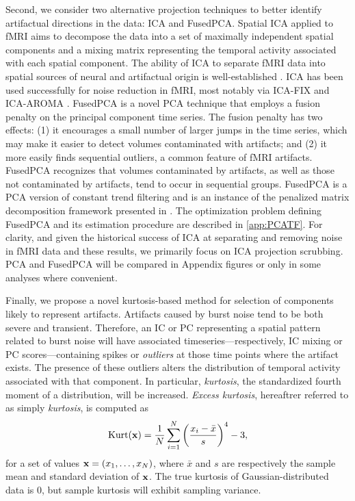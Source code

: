 \documentclass{article}
\begin{document}
Second, we consider two alternative projection techniques to better identify artifactual directions in the data: ICA and FusedPCA.  Spatial ICA applied to fMRI aims to decompose the data into a set of maximally independent spatial components and a mixing matrix representing the temporal activity associated with each spatial component. The ability of ICA to separate fMRI data into spatial sources of neural and artifactual origin is well-established \citep{mckeown1998analysis}. ICA has been used successfully for noise reduction in fMRI, most notably via ICA-FIX \citep{griffantiICAbasedArtefactRemoval2014} and ICA-AROMA \citep{pruimICAAROMARobustICAbased2015}. %
FusedPCA is a novel PCA technique that employs a fusion penalty on the principal component time series. The fusion penalty has two effects: (1) it encourages a small number of larger jumps in the time series, which may make it easier to detect volumes contaminated with artifacts; and (2) it more easily finds sequential outliers, a common feature of fMRI artifacts. FusedPCA recognizes that volumes contaminated by artifacts, as well as those not contaminated by artifacts, tend to occur in sequential groups. FusedPCA is a PCA version of constant trend filtering \citep{tibshiraniAdaptivePiecewisePolynomial2014, kimEllTrendFiltering2009} and is an instance of the penalized matrix decomposition framework presented in \cite{wittenPenalizedMatrixDecomposition2009}. The optimization problem defining FusedPCA and its estimation procedure are described in \autoref{app:PCATF}. For clarity, and given the historical success of ICA at separating and removing noise in fMRI data and these results, we primarily focus on ICA projection scrubbing. PCA and FusedPCA will be compared in Appendix figures or only in some analyses where convenient. 

Finally, we propose a novel kurtosis-based method for selection of components likely to represent artifacts. Artifacts caused by burst noise tend to be both severe and transient. Therefore, an IC or PC representing a spatial pattern related to burst noise will have associated timeseries---respectively, IC mixing or PC scores---containing spikes or \textit{outliers} at those time points where the artifact exists. The presence of these outliers alters the distribution of temporal activity associated with that component. In particular, \textit{kurtosis}, the standardized fourth moment of a distribution, will be increased. \textit{Excess kurtosis}, hereaftrer referred to as simply \textit{kurtosis}, is computed as 
$$
\text{Kurt}(\mathbf x) = \frac{1}{N} \sum_{i=1}^N \left(\frac{x_i - \bar{x}}{s} \right)^4 - 3,
$$
for a set of values $\mathbf x=(x_1,\dots,x_N)$, where $\bar{x}$ and $s$ are respectively the sample mean and standard deviation of $\mathbf x$. The true kurtosis of Gaussian-distributed data is $0$, but sample kurtosis will exhibit sampling variance.  
\end{document}
